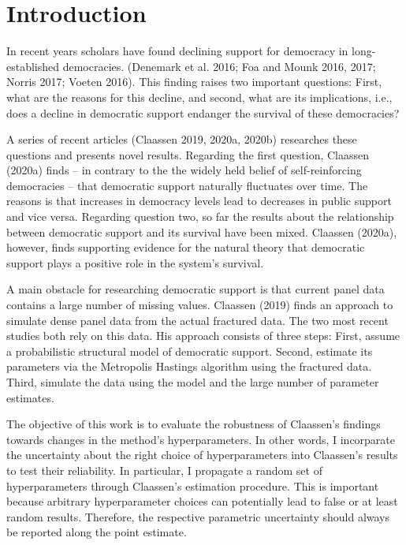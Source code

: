 \documentclass[12pt,english,a4paper,oneside]{article}
\theoremstyle{definition}
\theoremstyle{definition}
\theoremstyle{definition}
\theoremstyle{definition}
\theoremstyle{remark}
\begin{document}
\newpage







{
\setcounter{tocdepth}{2}
\newpage
{}
\tableofcontents
}

\newpage
{}
\pagestyle{plain}
\hypertarget{introduction}{%
\section{Introduction}\label{introduction}}

In recent years scholars have found declining support for democracy in long-established democracies. (Denemark et al. 2016; Foa and Mounk 2016, 2017; Norris 2017; Voeten 2016). This finding raises two important questions: First, what are the reasons for this decline, and second, what are its implications, i.e., does a decline in democratic support endanger the survival of these democracies?

A series of recent articles (Claassen 2019, 2020a, 2020b) researches these questions and presents novel results. Regarding the first question, Claassen (2020a) finds -- in contrary to the the widely held belief of self-reinforcing democracies -- that democratic support naturally fluctuates over time. The reasons is that increases in democracy levels lead to decreases in public support and vice versa. Regarding question two, so far the results about the relationship between democratic support and its survival have been mixed. Claassen (2020a), however, finds supporting evidence for the natural theory that democratic support plays a positive role in the system's survival.

A main obstacle for researching democratic support is that current panel data contains a large number of missing values. Claassen (2019) finds an approach to simulate dense panel data from the actual fractured data. The two most recent studies both rely on this data. His approach consists of three steps: First, assume a probabilistic structural model of democratic support. Second, estimate its parameters via the Metropolis Hastings algorithm using the fractured data. Third, simulate the data using the model and the large number of parameter estimates.

The objective of this work is to evaluate the robustness of Claassen's findings towards changes in the method's hyperparameters. In other words, I incorparate the uncertainty about the right choice of hyperparameters into Claassen's results to test their reliability. In particular, I propagate a random set of hyperparameters through Claassen's estimation procedure. This is important because arbitrary hyperparameter choices can potentially lead to false or at least random results. Therefore, the respective parametric uncertainty should always be reported along the point estimate.
\end{document}
